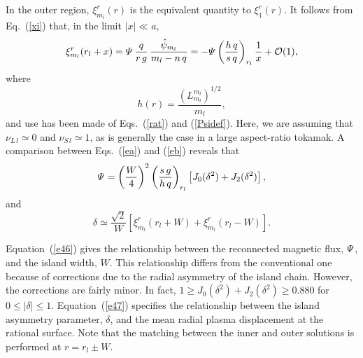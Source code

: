\documentclass{iopjournal}
\begin{document}
In the outer region,  $\xi_{m_{l}}^r(r)$ is the equivalent quantity to $\xi_1^r(r)$.  It follows from Eq.~(\ref{xi}) that, in the limit $|x|\ll a$, 
\begin{equation}\label{eb}
\xi_{m_{l}}^r(r_{l}+x)={\mit\Psi}\,\frac{q}{r\,g}\,\frac{\hat{\psi}_{m_{l}}}{m_{l}-n\,q}
= -{\mit\Psi}\left(\frac{h\,q}{s\,q}\right)_{r_l}\frac{1}{x} + {\cal O}(1),
\end{equation}
where 
\begin{equation}
h(r) = \frac{(L_{m_{l}}^{m_{l}})^{1/2}}{m_{l}},
\end{equation}
and use has been made of Eqs.~(\ref{rat}) and (\ref{Psidef}). Here, we are assuming that $\nu_{L\,l}\simeq 0$ and $\nu_{S\,l}\simeq 1$,
as is generally the case in a large aspect-ratio tokamak. 
A comparison between Eqs.~(\ref{ea}) and (\ref{eb}) reveals that
\begin{equation}\label{e46}
{\mit\Psi} = \left(\frac{W}{4}\right)^2\left(\frac{s\,g}{h\,q}\right)_{r_{l}}\left[J_0(\delta^2)+ J_2(\delta^2)\right],
\end{equation}
and
\begin{equation}\label{e47}
\delta \simeq \frac{\sqrt{2}}{W}\left[\xi_{m_{l}}^r(r_{l}+W)+\xi_{m_{l}}^r(r_{l}-W)\right].
\end{equation}

Equation~(\ref{e46}) gives the relationship between the reconnected magnetic flux, ${\mit\Psi}$, and the island width, $W$. This relationship
differs from the conventional one \cite{ntm1} because of corrections due to the radial asymmetry of the island chain. However, the corrections are fairly
minor. In fact, $1\geq J_0(\delta^2)+ J_2(\delta^2)\geq 0.880$ for $0\leq |\delta|\leq 1$. Equation~(\ref{e47}) specifies the relationship between the
island asymmetry parameter, $\delta$,  and the mean radial plasma displacement at the rational surface. Note that the matching
between the inner and outer solutions is performed at $r=r_{l}\pm W$. 
\end{document}
